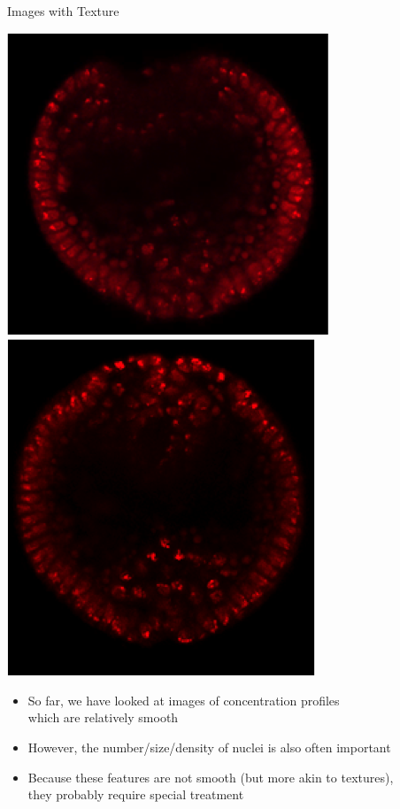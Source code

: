 \documentclass[10pt]{beamer}
\begin{document}
\begin{frame}{Images with Texture}
\begin{center}
\hspace{0.2in}
\includegraphics[width=\imwidth]{nuclei10}
\hspace{0.2in}
\includegraphics[width=\imwidth]{nuclei11}
\end{center}

\begin{itemize}
\item So far, we have looked at images of concentration profiles \\ which are relatively smooth
\item However, the number/size/density of nuclei is also often important
\item Because these features are not smooth (but more akin to textures), \\they probably require special treatment
\end{itemize}
\end{frame}
\end{document}
